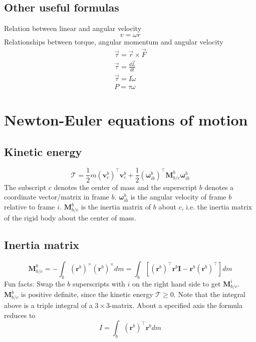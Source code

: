 \subsection{Other useful formulas}
Relation between linear and angular velocity
\begin{equation}
    v = \omega r
\end{equation}
Relationships between torque, angular momentum and angular velocity
\begin{align}
    \vec{\tau} = \vec{r} \times \vec{F}\\
    \vec{\tau} = \frac{d\vec{L}}{dt}\\
    \vec{\tau} = I \dot{\omega}\\
    P = \tau \omega
\end{align}

\section{Newton-Euler equations of motion}
\subsection{Kinetic energy}
\begin{equation}
    \mathcal{T} = \frac{1}{2} m (\mathbf{v}_c^b)^\top \mathbf{v}_c^b +  \frac{1}{2} (\boldsymbol{\omega}_{ib}^b)^\top \mathbf{M}_{b/c}^b \boldsymbol{\omega}_{ib}^b
\end{equation}
The subscript $c$ denotes the center of mass and the superscript $b$ denotes a coordinate vector/matrix in frame $b$. $\boldsymbol{\omega}_{ib}^b$ is the angular velocity of frame $b$ relative to frame $i$. $\mathbf{M}_{b/c}^b$ is the inertia matrix of $b$ about $c$, i.e. the inertia matrix of the rigid body about the center of mass.

\subsection{Inertia matrix}
\begin{equation}
    \mathbf{M}_{b/c}^b = -\int_b (\mathbf{r}^b)^\times (\mathbf{r}^b)^\times dm = \int_b \left[ (\mathbf{r}^b)^\top \mathbf{r}^b \mathbf{I} - \mathbf{r}^b (\mathbf{r}^b)^\top \right] dm
\end{equation}
Fun facts: Swap the $b$ superscripts with $i$ on the right hand side to get $\mathbf{M}_{b/c}^i$. $\mathbf{M}_{b/c}^b$ is positive definite, since the kinetic energy $\mathcal{T} \geq 0$. Note that the integral above is a triple integral of a $3 \times 3$-matrix. About a specified axis the formula reduces to
\begin{equation}
    I = \int_{b} (\mathbf{r}^b)^\top \mathbf{r}^b dm
\end{equation}

